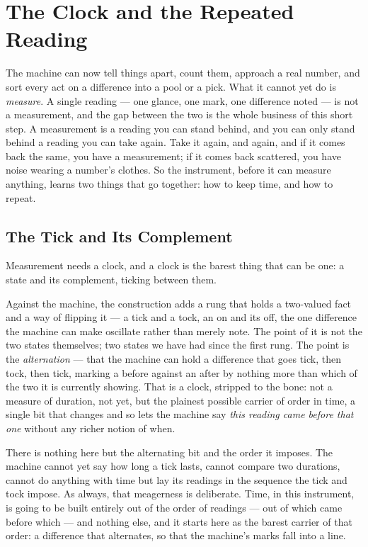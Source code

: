 \chapter{The Clock and the Repeated Reading}

The machine can now tell things apart, count them, approach a real number, and sort every act on a difference
into a pool or a pick. What it cannot yet do is \emph{measure}. A single reading --- one glance, one mark, one
difference noted --- is not a measurement, and the gap between the two is the whole business of this short
step. A measurement is a reading you can stand behind, and you can only stand behind a reading you can take
again. Take it again, and again, and if it comes back the same, you have a measurement; if it comes back
scattered, you have noise wearing a number's clothes. So the instrument, before it can measure anything, learns
two things that go together: how to keep time, and how to repeat.

\section{The Tick and Its Complement}

Measurement needs a clock, and a clock is the barest thing that can be one: a state and its complement, ticking
between them.

Against the machine, the construction adds a rung that holds a two-valued fact and a way of flipping it --- a
tick and a tock, an on and its off, the one difference the machine can make oscillate rather than merely note.
The point of it is not the two states themselves; two states we have had since the first rung. The point is the
\emph{alternation} --- that the machine can hold a difference that goes tick, then tock, then tick, marking a
before against an after by nothing more than which of the two it is currently showing. That is a clock, stripped
to the bone: not a measure of duration, not yet, but the plainest possible carrier of order in time, a single
bit that changes and so lets the machine say \emph{this reading came before that one} without any richer notion
of when.

There is nothing here but the alternating bit and the order it imposes. The machine cannot yet say how long a
tick lasts, cannot compare two durations, cannot do anything with time but lay its readings in the sequence the
tick and tock impose. As always, that meagerness is deliberate. Time, in this instrument, is going to be built
entirely out of the order of readings --- out of which came before which --- and nothing else, and it starts here
as the barest carrier of that order: a difference that alternates, so that the machine's marks fall into a line.

